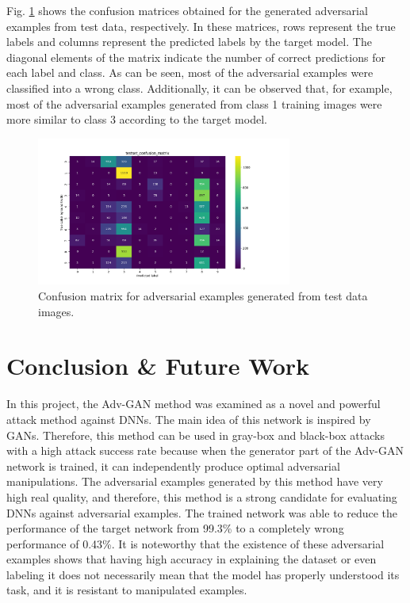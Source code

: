 \documentclass[lettersize,journal]{IEEEtran}
\begin{document}
Fig. \ref{testset_confusion_matrix} shows the confusion matrices obtained for the generated adversarial examples from test data, respectively. In these matrices, rows represent the true labels and columns represent the predicted labels by the target model. The diagonal elements of the matrix indicate the number of correct predictions for each label and class. As can be seen, most of the adversarial examples were classified into a wrong class. Additionally, it can be observed that, for example, most of the adversarial examples generated from class 1 training images were more similar to class 3 according to the target model.

\begin{figure}[!t]
\centering
\includegraphics[width=3.3in]{testset_confusion_matrix.PNG}
\caption{Confusion matrix for adversarial examples generated from test data images.}
\label{testset_confusion_matrix}
\end{figure}

\section{Conclusion \& Future Work}
In this project, the Adv-GAN method was examined as a novel and powerful attack method against DNNs. The main idea of this network is inspired by GANs. Therefore, this method can be used in gray-box and black-box attacks with a high attack success rate because when the generator part of the Adv-GAN network is trained, it can independently produce optimal adversarial manipulations. The adversarial examples generated by this method have very high real quality, and therefore, this method is a strong candidate for evaluating DNNs against adversarial examples.
The trained network was able to reduce the performance of the target network from 99.3\% to a completely wrong performance of 0.43\%.
It is noteworthy that the existence of these adversarial examples shows that having high accuracy in explaining the dataset or even labeling it does not necessarily mean that the model has properly understood its task, and it is resistant to manipulated examples.
\end{document}
